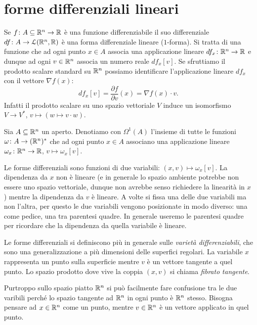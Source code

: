 \section{forme differenziali lineari}

Se $f\colon A\subseteq {\mathbb R}^n \to {\mathbb R}$ è una funzione differenziabile il suo 
differenziale $df \colon A \to \mathcal L ({\mathbb R}^n, {\mathbb R})$ è una forma differenziale lineare
($1$-forma).
Si tratta di una funzione che ad ogni punto $x\in A$ associa una applicazione lineare 
$df_x\colon {\mathbb R}^n \to {\mathbb R}$ e dunque ad ogni $v\in {\mathbb R}^n$ associa un numero reale 
$df_x[v]$. 
Se sfruttiamo il prodotto scalare standard su ${\mathbb R}^n$ 
possiamo identificare l'applicazione lineare $df_x$ con il vettore $\nabla f(x)$:
\[
    df_x[v] = \frac{\partial f}{\partial v}(x) = \nabla f(x) \cdot v.
\]
Infatti il prodotto scalare su uno spazio vettoriale $V$ 
induce un isomorfismo $V \to V^*$, $v \mapsto (w \mapsto v \cdot w)$.

\begin{definition}
    Sia $A\subseteq {\mathbb R}^n$ un aperto.
    Denotiamo con $\Omega^1(A)$ l'insieme di tutte le funzioni $\omega\colon A \to ({\mathbb R}^n)^*$
    che ad ogni punto $x\in A$ associano una applicazione lineare $\omega_x\colon {\mathbb R}^n \to {\mathbb R}$,
    $v\mapsto \omega_x[v]$.
\end{definition}

\begin{remark}
Le forme differenziali sono funzioni di due variabili: $(x,v)\mapsto \omega_x[v]$.
La dipendenza da $x$ non è lineare (e in generale lo spazio ambiente potrebbe non essere uno 
spazio vettoriale, dunque non avrebbe senso richiedere la linearità in $x$)
mentre la dipendenza da $v$ è lineare. 
A volte si fissa una delle due variabili ma non l'altra,
per questo le due variabili vengono posizionate in modo diverso: 
una come pedice, una tra parentesi quadre.
In generale useremo le parentesi quadre per ricordare che la dipendenza da quella variabile è lineare.

Le forme differenziali si definiscono più in generale sulle \emph{varietà differenziabili}, che sono una 
generalizzazione a più dimensioni delle superfici regolari.
La variabile $x$ rappresenta un punto sulla superficie mentre $v$ è un vettore tangente 
a quel punto. Lo spazio prodotto dove vive la coppia $(x,v)$ si chiama \emph{fibrato tangente}.

Purtroppo sullo spazio piatto ${\mathbb R}^n$ si può facilmente fare confusione tra le due varibili 
perché lo spazio tangente ad ${\mathbb R}^n$ in ogni punto è ${\mathbb R}^n$ stesso.
Bisogna pensare ad $x\in {\mathbb R}^n$ come un punto, 
mentre $v\in {\mathbb R}^n$ è un vettore applicato in quel punto.
\end{remark}

